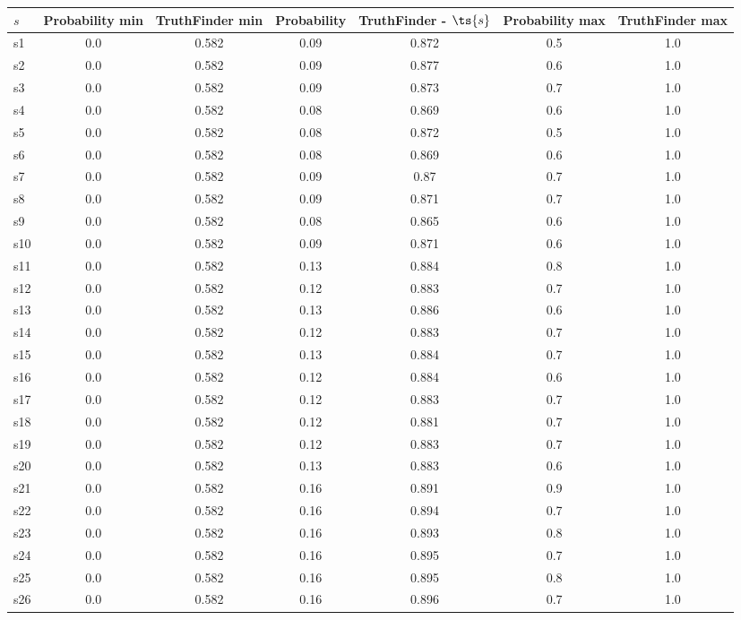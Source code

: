 \documentclass{article}
\begin{document}
\noindent\begin{tabular}{|l|c|c|c|c|c|c|}
\hline
$s$& Probability min & TruthFinder min & Probability & TruthFinder - $\ts{s}$ & Probability max & TruthFinder max\\
\hline
s1 &0.0 & 0.582 & 0.09 & 0.872 & 0.5 & 1.0\\
\hline
s2 &0.0 & 0.582 & 0.09 & 0.877 & 0.6 & 1.0\\
\hline
s3 &0.0 & 0.582 & 0.09 & 0.873 & 0.7 & 1.0\\
\hline
s4 &0.0 & 0.582 & 0.08 & 0.869 & 0.6 & 1.0\\
\hline
s5 &0.0 & 0.582 & 0.08 & 0.872 & 0.5 & 1.0\\
\hline
s6 &0.0 & 0.582 & 0.08 & 0.869 & 0.6 & 1.0\\
\hline
s7 &0.0 & 0.582 & 0.09 & 0.87 & 0.7 & 1.0\\
\hline
s8 &0.0 & 0.582 & 0.09 & 0.871 & 0.7 & 1.0\\
\hline
s9 &0.0 & 0.582 & 0.08 & 0.865 & 0.6 & 1.0\\
\hline
s10 &0.0 & 0.582 & 0.09 & 0.871 & 0.6 & 1.0\\
\hline
s11 &0.0 & 0.582 & 0.13 & 0.884 & 0.8 & 1.0\\
\hline
s12 &0.0 & 0.582 & 0.12 & 0.883 & 0.7 & 1.0\\
\hline
s13 &0.0 & 0.582 & 0.13 & 0.886 & 0.6 & 1.0\\
\hline
s14 &0.0 & 0.582 & 0.12 & 0.883 & 0.7 & 1.0\\
\hline
s15 &0.0 & 0.582 & 0.13 & 0.884 & 0.7 & 1.0\\
\hline
s16 &0.0 & 0.582 & 0.12 & 0.884 & 0.6 & 1.0\\
\hline
s17 &0.0 & 0.582 & 0.12 & 0.883 & 0.7 & 1.0\\
\hline
s18 &0.0 & 0.582 & 0.12 & 0.881 & 0.7 & 1.0\\
\hline
s19 &0.0 & 0.582 & 0.12 & 0.883 & 0.7 & 1.0\\
\hline
s20 &0.0 & 0.582 & 0.13 & 0.883 & 0.6 & 1.0\\
\hline
s21 &0.0 & 0.582 & 0.16 & 0.891 & 0.9 & 1.0\\
\hline
s22 &0.0 & 0.582 & 0.16 & 0.894 & 0.7 & 1.0\\
\hline
s23 &0.0 & 0.582 & 0.16 & 0.893 & 0.8 & 1.0\\
\hline
s24 &0.0 & 0.582 & 0.16 & 0.895 & 0.7 & 1.0\\
\hline
s25 &0.0 & 0.582 & 0.16 & 0.895 & 0.8 & 1.0\\
\hline
s26 &0.0 & 0.582 & 0.16 & 0.896 & 0.7 & 1.0\\

\end{tabular}
\end{document}
